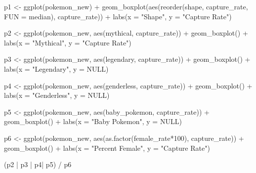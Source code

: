 \documentclass[
]{article}
\newenvironment{Shaded}{\begin{snugshade}}{\end{snugshade}}
\newcommand{\AttributeTok}[1]{\textcolor[rgb]{0.77,0.63,0.00}{#1}}
\newcommand{\ConstantTok}[1]{\textcolor[rgb]{0.00,0.00,0.00}{#1}}
\newcommand{\DecValTok}[1]{\textcolor[rgb]{0.00,0.00,0.81}{#1}}
\newcommand{\FunctionTok}[1]{\textcolor[rgb]{0.00,0.00,0.00}{#1}}
\newcommand{\NormalTok}[1]{#1}
\newcommand{\OtherTok}[1]{\textcolor[rgb]{0.56,0.35,0.01}{#1}}
\newcommand{\SpecialCharTok}[1]{\textcolor[rgb]{0.00,0.00,0.00}{#1}}
\newcommand{\StringTok}[1]{\textcolor[rgb]{0.31,0.60,0.02}{#1}}
\begin{document}
\begin{Shaded}
\begin{Highlighting}[]
\NormalTok{p1 }\OtherTok{\textless{}{-}} \FunctionTok{ggplot}\NormalTok{(pokemon\_new) }\SpecialCharTok{+}
  \FunctionTok{geom\_boxplot}\NormalTok{(}\FunctionTok{aes}\NormalTok{(}\FunctionTok{reorder}\NormalTok{(shape, capture\_rate, }\AttributeTok{FUN =}\NormalTok{ median), capture\_rate)) }\SpecialCharTok{+}
  \FunctionTok{labs}\NormalTok{(}\AttributeTok{x =} \StringTok{"Shape"}\NormalTok{, }\AttributeTok{y =} \StringTok{"Capture Rate"}\NormalTok{)}

\NormalTok{p2 }\OtherTok{\textless{}{-}} \FunctionTok{ggplot}\NormalTok{(pokemon\_new, }\FunctionTok{aes}\NormalTok{(mythical, capture\_rate)) }\SpecialCharTok{+} 
  \FunctionTok{geom\_boxplot}\NormalTok{() }\SpecialCharTok{+}
  \FunctionTok{labs}\NormalTok{(}\AttributeTok{x =} \StringTok{"Mythical"}\NormalTok{, }\AttributeTok{y =} \StringTok{"Capture Rate"}\NormalTok{)}

\NormalTok{p3 }\OtherTok{\textless{}{-}} \FunctionTok{ggplot}\NormalTok{(pokemon\_new, }\FunctionTok{aes}\NormalTok{(legendary, capture\_rate)) }\SpecialCharTok{+} 
  \FunctionTok{geom\_boxplot}\NormalTok{() }\SpecialCharTok{+}
  \FunctionTok{labs}\NormalTok{(}\AttributeTok{x =} \StringTok{"Legendary"}\NormalTok{, }\AttributeTok{y =} \ConstantTok{NULL}\NormalTok{)}

\NormalTok{p4 }\OtherTok{\textless{}{-}} \FunctionTok{ggplot}\NormalTok{(pokemon\_new, }\FunctionTok{aes}\NormalTok{(genderless, capture\_rate)) }\SpecialCharTok{+} 
  \FunctionTok{geom\_boxplot}\NormalTok{() }\SpecialCharTok{+}
  \FunctionTok{labs}\NormalTok{(}\AttributeTok{x =} \StringTok{"Genderless"}\NormalTok{, }\AttributeTok{y =} \ConstantTok{NULL}\NormalTok{)}

\NormalTok{p5 }\OtherTok{\textless{}{-}} \FunctionTok{ggplot}\NormalTok{(pokemon\_new, }\FunctionTok{aes}\NormalTok{(baby\_pokemon, capture\_rate)) }\SpecialCharTok{+} 
  \FunctionTok{geom\_boxplot}\NormalTok{() }\SpecialCharTok{+}
  \FunctionTok{labs}\NormalTok{(}\AttributeTok{x =} \StringTok{"Baby Pokemon"}\NormalTok{, }\AttributeTok{y =} \ConstantTok{NULL}\NormalTok{)}
 
\NormalTok{p6 }\OtherTok{\textless{}{-}} \FunctionTok{ggplot}\NormalTok{(pokemon\_new, }\FunctionTok{aes}\NormalTok{(}\FunctionTok{as.factor}\NormalTok{(female\_rate}\SpecialCharTok{*}\DecValTok{100}\NormalTok{), capture\_rate)) }\SpecialCharTok{+}
  \FunctionTok{geom\_boxplot}\NormalTok{() }\SpecialCharTok{+}
  \FunctionTok{labs}\NormalTok{(}\AttributeTok{x =} \StringTok{"Percent Female"}\NormalTok{, }\AttributeTok{y =} \StringTok{"Capture Rate"}\NormalTok{)}
             
\NormalTok{(p2 }\SpecialCharTok{|}\NormalTok{ p3 }\SpecialCharTok{|}\NormalTok{ p4}\SpecialCharTok{|}\NormalTok{ p5) }\SpecialCharTok{/}\NormalTok{ p6}
\end{Highlighting}
\end{Shaded}
\end{document}
